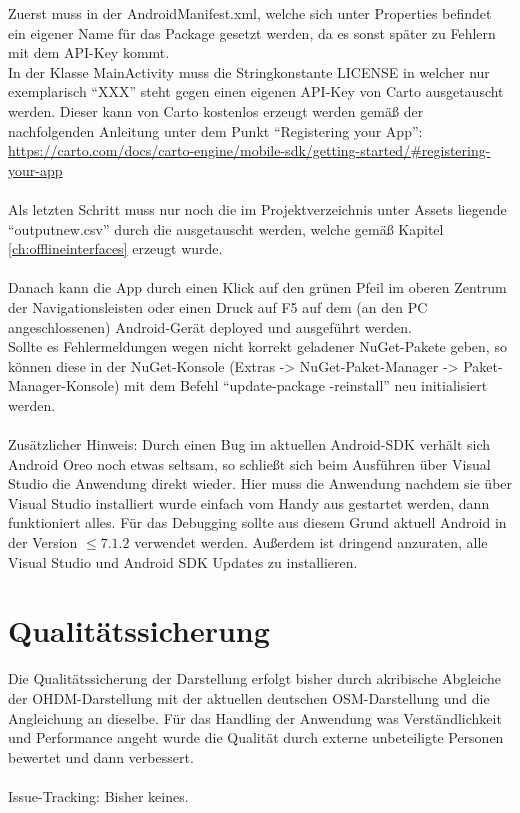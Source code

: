 Zuerst muss in der AndroidManifest.xml, welche sich unter Properties befindet ein eigener Name für das Package gesetzt werden, da es sonst später zu Fehlern mit dem API-Key kommt.\\
In der Klasse MainActivity muss die Stringkonstante LICENSE in welcher nur exemplarisch ``XXX'' steht gegen einen eigenen API-Key von Carto ausgetauscht werden. Dieser kann von Carto kostenlos erzeugt werden gemäß der nachfolgenden Anleitung unter dem Punkt ``Registering your App'':\\
\url{https://carto.com/docs/carto-engine/mobile-sdk/getting-started/#registering-your-app}\\\\
Als letzten Schritt muss nur noch die im Projektverzeichnis unter Assets liegende ``outputnew.csv'' durch die ausgetauscht werden, welche gemäß Kapitel \ref{ch:offlineinterfaces} erzeugt wurde.\\\\
Danach kann die App durch einen Klick auf den grünen Pfeil im oberen Zentrum der Navigationsleisten oder einen Druck auf F5 auf dem (an den PC angeschlossenen) Android-Gerät deployed und ausgeführt werden.\\
Sollte es Fehlermeldungen wegen nicht korrekt geladener NuGet-Pakete geben, so können diese in der NuGet-Konsole (Extras -> NuGet-Paket-Manager -> Paket-Manager-Konsole) mit dem Befehl ``update-package -reinstall'' neu initialisiert werden.\\\\
Zusätzlicher Hinweis: Durch einen Bug im aktuellen Android-SDK verhält sich Android Oreo noch etwas seltsam, so schließt sich beim Ausführen über Visual Studio die Anwendung direkt wieder. Hier muss die Anwendung nachdem sie über Visual Studio installiert wurde einfach vom Handy aus gestartet werden, dann funktioniert alles. Für das Debugging sollte aus diesem Grund aktuell Android in der Version  $\leq7.1.2$ verwendet werden. Außerdem ist dringend anzuraten, alle Visual Studio und Android SDK Updates zu installieren.


\section{Qualitätssicherung}

Die Qualitätssicherung der Darstellung erfolgt bisher durch akribische Abgleiche der OHDM-Darstellung mit der aktuellen deutschen OSM-Darstellung und die Angleichung an dieselbe. Für das Handling der Anwendung was Verständlichkeit und Performance angeht wurde die Qualität durch externe unbeteiligte Personen bewertet und dann verbessert.\\
\\
Issue-Tracking: Bisher keines.

